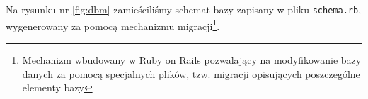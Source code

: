 Na rysunku nr \ref{fig:dbm} zamieściliśmy schemat bazy zapisany w pliku \texttt{schema.rb}, wygenerowany za pomocą mechanizmu migracji\footnote{Mechanizm wbudowany w Ruby on Rails pozwalający na modyfikowanie bazy danych za pomocą specjalnych plików, tzw. migracji opisujących poszczególne elementy bazy\cite{rails4_way}}.

\begin{code}
  
\end{code}
